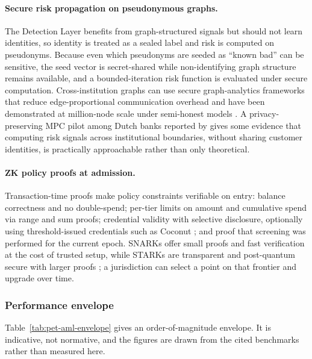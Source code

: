 \documentclass[11pt]{article}
\begin{document}
\paragraph{Secure risk propagation on pseudonymous graphs.} The Detection Layer benefits from
graph-structured signals but should not learn identities, so identity is treated as a sealed label
and risk is computed on pseudonyms. Because even which pseudonyms are seeded as ``known bad'' can be
sensitive, the seed vector is secret-shared while non-identifying graph structure remains available,
and a bounded-iteration risk function is evaluated under secure computation. Cross-institution graphs
can use secure graph-analytics frameworks that reduce edge-proportional communication overhead and
have been demonstrated at million-node scale under semi-honest models \citep{Koti2024Graphiti,
Yu2025GraphAce}. A privacy-preserving MPC pilot among Dutch banks reported by \citet{vanEgmond2024}
gives some evidence that computing risk signals across institutional boundaries, without sharing
customer identities, is practically approachable rather than only theoretical.

\paragraph{ZK policy proofs at admission.} Transaction-time proofs make policy constraints verifiable
on entry: balance correctness and no double-spend; per-tier limits on amount and cumulative spend via
range and sum proofs; credential validity with selective disclosure, optionally using threshold-issued
credentials such as Coconut \citep{Sonnino2019Coconut}; and proof that screening was performed for the
current epoch. SNARKs offer small proofs and fast verification at the cost of trusted setup, while
STARKs are transparent and post-quantum secure with larger proofs \citep{ElHajj2024ZKBench}; a
jurisdiction can select a point on that frontier and upgrade over time.

\subsubsection{Performance envelope}

Table~\ref{tab:pet-aml-envelope} gives an order-of-magnitude envelope. It is indicative, not
normative, and the figures are drawn from the cited benchmarks rather than measured here.
\end{document}
